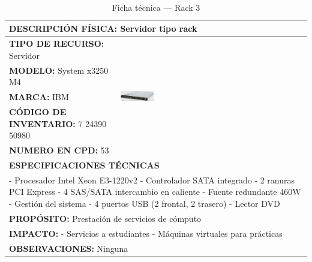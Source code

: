 \begin{table}[H]
\centering
\scriptsize
\setlength{\tabcolsep}{2pt}
\renewcommand{\arraystretch}{1.0}
\caption{Ficha técnica --- Rack 3}
\label{tab:rack-3}
\begin{tabular}{|p{}|p{}|}
\hline
\multicolumn{2}{|l|}{\textbf{DESCRIPCIÓN FÍSICA:} Servidor tipo rack} \\ \hline
\textbf{TIPO DE RECURSO:} Servidor & 
\multirow{5}{*}{\includegraphics[width=0.18\textwidth,keepaspectratio]{tablas-images/cp1/racks/rack-1.png}} \\ \cline{1-1}
\textbf{MODELO:} System x3250 M4 & \\ \cline{1-1}
\textbf{MARCA:} IBM & \\ \cline{1-1}
\textbf{CÓDIGO DE INVENTARIO:} 7 24390 50980 & \\ \cline{1-1}
\textbf{NUMERO EN CPD:} 53 & \\ \hline
\multicolumn{2}{|l|}{\textbf{ESPECIFICACIONES TÉCNICAS}} \\ \hline
\multicolumn{2}{|p{0.7\textwidth}|}{
- Procesador Intel Xeon E3-1220v2
- Controlador SATA integrado
- 2 ranuras PCI Express
- 4 SAS/SATA intercambio en caliente
- Fuente redundante 460W
- Gestión del sistema
- 4 puertos USB (2 frontal, 2 trasero)
- Lector DVD
} \\ \hline
\multicolumn{2}{|l|}{\textbf{PROPÓSITO:} Prestación de servicios de cómputo} \\ \hline
\multicolumn{2}{|p{0.7\textwidth}|}{\textbf{IMPACTO:} 
- Servicios a estudiantes
- Máquinas virtuales para prácticas} \\ \hline
\multicolumn{2}{|p{0.7\textwidth}|}{\textbf{OBSERVACIONES:} Ninguna} \\ \hline
\end{tabular}
\end{table}


